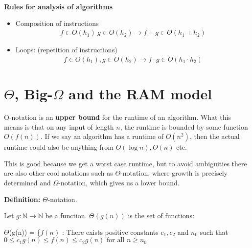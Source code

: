 \documentclass[11pt,a4paper,titlepage,dvipsnames,cmyk]{scrartcl}
\begin{document}
\textbf{Rules for analysis of algorithms}
\begin{itemize}
    \item Composition of instructions
\begin{align*}
    f \in O(h_1)\ g\in O(h_2) \rightarrow f + g \in O(h_1 + h_2)
\end{align*}
    \item Loops: (repetition of instructions)
\begin{align*}
    f \in O(h_1), g \in O(h_2) \rightarrow f \cdot g \in O(h_1 \cdot h_2)
\end{align*}
\end{itemize}

\section{$\Theta$, Big-$\Omega$ and the RAM model}%
\label{sec:bigtheta}

O-notation is an \textbf{upper bound} for the runtime of an algorithm.
What this means is that on any input of length $n$, the runtime is bounded
by some function $O(f(n))$. If we say an algorithm has a runtime of
$O(n^2)$, then the actual runtime could also be anything from $O(\log n),
O(n)$ etc. 

This is good because we get a worst case runtime, but to avoid ambiguities
there are also other cool notations such as $\Theta$-notation, where
growth is precisely determined and $\Omega$-notation, which gives us a
lower bound.

\begin{tcolorbox}
    \textbf{Definition:} $\Theta$-notation. 

    \bigskip

    Let $g : \mathbb{N} \rightarrow \mathbb{N}$ be a function.
    $\Theta(g(n))$ is the set of functions:
    \bigskip

    $\Theta$(g(n)) = \{$f(n)$ : There exists positive constants $c_1, c_2$
        and $n_0$ such that $0 \le c_1 g(n) \le f(n) \le c_2g(n) \text{ for all }
        n\ge n_0$
\end{tcolorbox}
\end{document}
